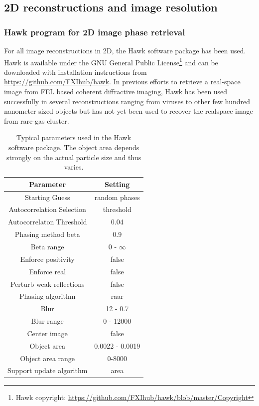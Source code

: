 \subsection{2D reconstructions and image resolution}
%
%
%
\subsubsection{Hawk program for 2D image phase retrieval}
For all image reconstructions in 2D, the Hawk software package \citep{Maia-2010-JAC} has been used. Hawk is available under the GNU General Public License\footnote{Hawk copyright: \url{https://github.com/FXIhub/hawk/blob/master/Copyright}} and can be downloaded with installation instructions from \url{https://github.com/FXIhub/hawk}. In previous efforts to retrieve a real-space image from FEL based coherent diffractive imaging, Hawk has been used successfully in several reconstructions ranging from viruses \citep{Seibert-2011-Nature,Ekeberg-2015-PRL} to other few hundred nanometer sized objects \citep{Seibert-2010-JPhysB} but has not yet been used to recover the realspace image from rare-gas cluster.
\begin{table}%
\centering
\begin{tabular}{ |c|c|}
 \hline
 \textbf{Parameter} & \textbf{Setting} \\ 
 \hline
 Starting Guess & random phases \\ \hline
 Autocorrelation Selection & threshold \\ \hline
 Autocorrelaton Threshold & 0.04  \\ \hline
 Phasing method beta & 0.9  \\ \hline
 Beta range & 0 - $\infty$ \\ \hline
 Enforce positivity & false   \\ \hline
 Enforce real & false     \\\hline
Perturb weak reflections & false \\ \hline
Phasing algorithm & raar \\ \hline
Blur & 12 - 0.7 \\ \hline
Blur range & 0 - 12000 \\ \hline
Center image & false \\ \hline
Object area & 0.0022 - 0.0019 \\ \hline
Object area range & 0-8000\\ \hline
Support update algorithm & area \\ \hline
\end{tabular}
\caption[Typical parameters used in the Hawk software package.]{Typical parameters used in the Hawk software package. The object area depends strongly on the actual particle size and thus varies.}
\label{tab:hawk-parameter}
\end{table}
